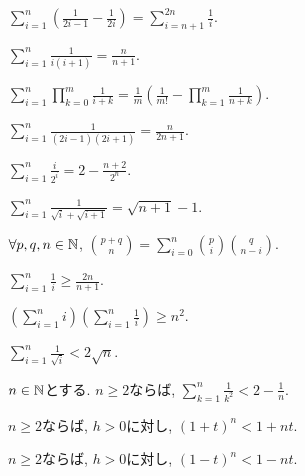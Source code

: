 \begin{prop}
  $\sum_{i=1}^n\left( \frac{1}{2i-1}-\frac{1}{2i}\right)=\sum_{i=n+1}^{2n}\frac{1}{i}$.
\end{prop}

\begin{prop}
  $\sum_{i=1}^n\frac{1}{i(i+1)}=\frac{n}{n+1}$.
\end{prop}

\begin{prop}
  $\sum_{i=1}^n\prod_{k=0}^{m}\frac{1}{i+k}=\frac{1}{m}\left(\frac{1}{m!}-\prod_{k=1}^m\frac{1}{n+k}\right)$.
\end{prop}


\begin{prop}
  $\sum_{i=1}^n\frac{1}{(2i-1)(2i+1)}=\frac{n}{2n+1}$.
\end{prop}

\begin{prop}
  $\sum_{i=1}^n\frac{i}{2^i}=2-\frac{n+2}{2^n}$.
\end{prop}


\begin{prop}
  $\sum_{i=1}^n \frac{1}{\sqrt{i}+\sqrt{i+1}}=\sqrt{n+1}-1$.
\end{prop}

\begin{prop}
  $\forall p,q,n\in\mathbb{N}$,
  $\binom{p+q}{n}=\sum_{i=0}^n\binom{p}{i}\binom{q}{n-i}$.
\end{prop}


\begin{prop}
$\sum_{i=1}^{n}\frac{1}{i}\geq \frac{2n}{n+1}$.
\end{prop}

\begin{prop}
$\left(\sum_{i=1}^{n}i\right)\left(\sum_{i=1}^{n}\frac{1}{i}\right)\geq n^2$.
\end{prop}

\begin{prop}
$\sum_{i=1}^{n}\frac{1}{\sqrt{i}}<2\sqrt{n}$.
\end{prop}

\begin{prop}
$n\in\mathbb{N}$とする.
  $n\geq 2$ならば, $\sum_{k=1}^n\frac{1}{k^2} < 2-\frac{1}{n}$.
\end{prop}

\begin{prop}
  $n\geq 2$ならば,  $h>0$に対し,
$(1+t)^n<1+nt$.
\end{prop}
\begin{prop}
  $n\geq 2$ならば,  $h>0$に対し,
$(1-t)^n<1-nt$.
\end{prop}

